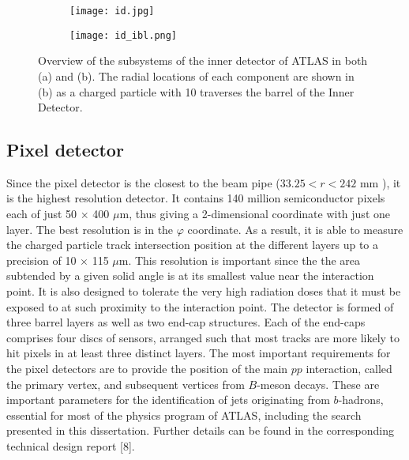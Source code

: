 \begin{figure}[htb!]
\centering
\begin{subfigure}[t]{0.5\textwidth}
\texttt{[image: id.jpg]}
\subcaption{}
\label{fig:exp.atlas.id.all}
\end{subfigure}
\begin{subfigure}[t]{0.45\textwidth}
\texttt{[image: id\_ibl.png]}
\subcaption{}
\label{fig:exp.atlas.id.rad}
\end{subfigure}
\vspace{-0.25cm}
\caption{Overview of the subsystems of the inner detector of ATLAS in both (a) and (b).
The radial locations of each component are shown in (b) as 
 a charged particle with 10 \GeV \pt traverses the barrel of the Inner Detector.} %
\label{fig:exp.atlas.id}
\end{figure}


\subsection*{Pixel detector}
Since the pixel detector is the closest to the beam pipe ($33.25 < r <242$ mm ), it is
the highest resolution detector. It contains 140 million semiconductor pixels each of just
50 $\times$ 400 $\mu$m, 
thus giving a 2-dimensional coordinate with just one layer. The best resolution is in the $\varphi$ coordinate. 
As a result, it is able to measure the charged particle track intersection 
position at the different layers  up
to a precision of 10 $\times$ 115 $\mu$m.
This resolution is important since the 
the area subtended by a given solid angle is at its smallest value near the interaction point.
 It is also designed to tolerate the very high radiation
doses that it must be exposed to at such proximity to the interaction point. The detector is
formed of three barrel layers as well as two end-cap structures. Each of the end-caps
comprises four discs of sensors, arranged such that most tracks are more likely to hit pixels in at
least three distinct layers.
The most important requirements for the pixel detectors are to provide the position of the main $pp$
interaction, called the primary vertex, and subsequent vertices from 
$B$-meson decays. These are important parameters for the identification of jets originating from $b$-hadrons,
essential for most of the physics program of ATLAS, including the search presented in this dissertation. 
 Further details can be found in the corresponding technical design report [8].


